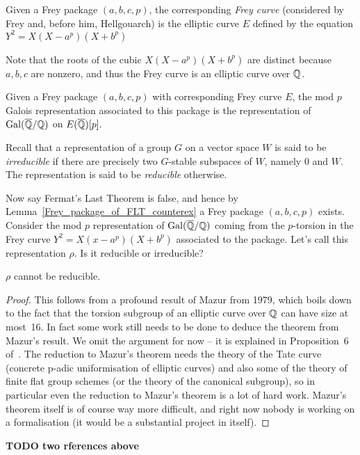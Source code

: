 \begin{definition}[Frey]\label{Frey_curve} Given a Frey package $(a,b,c,p)$, the corresponding \emph{Frey curve} (considered by Frey and, before him, Hellgouarch) is the elliptic curve $E$ defined by the equation $Y^2=X(X-a^p)(X+b^p)$\end{definition}

Note that the roots of the cubic $X(X-a^p)(X+b^p)$ are distinct because $a,b,c$ are nonzero, and thus the Frey curve is an
elliptic curve over $\mathbb{Q}$.

\begin{definition}\label{Frey_mod_p_Galois_representation} Given a Frey package $(a,b,c,p)$ with corresponding Frey curve $E$, the mod $p$ Galois representation associated to this package is the representation of $\operatorname{Gal}(\overline{\mathbb{Q}}/\mathbb{Q})$ on $E(\overline{\mathbb{Q}})[p].$\end{definition}

Recall that a representation of a group $G$ on a vector space $W$ is said to be \emph{irreducible} if there are precisely two $G$-stable subspaces of $W$, namely $0$ and $W$. The representation is said to be \emph{reducible} otherwise.

Now say Fermat's Last Theorem is false, and hence by Lemma~\ref{Frey_package_of_FLT_counterex} a Frey package $(a,b,c,p)$ exists.  Consider the mod $p$ representation of $\operatorname{Gal}(\overline{\mathbb{Q}}/\mathbb{Q})$ coming from the $p$-torsion in the Frey curve $Y^2=X(x-a^p)(X+b^p)$
associated to the package. Let's call this representation $\rho$. Is it reducible or irreducible?

\begin{theorem}[Mazur]\label{Mazur_on_Frey_curve}\leanok $\rho$ cannot be reducible.\end{theorem}
\begin{proof}\tangled This follows from a profound result of Mazur \cite{mazur} from 1979, which boils down to the fact that the torsion subgroup of an elliptic curve over $\mathbb{Q}$ can have size at most~16. In fact some work still needs to be done to deduce the theorem from Mazur's result. We omit the argument for now -- it is explained in Proposition~6 of~\cite{serreconj}. The reduction to Mazur's theorem
needs the theory of the Tate curve (concrete p-adic uniformisation of elliptic curves) and also some of the theory of finite flat group schemes (or the theory of the canonical subgroup), so in particular even the reduction to Mazur's theorem is a lot of hard work.
Mazur's theorem itself is of course way more difficult, and right now nobody is working on a formalisation (it would be a substantial
project in itself).
\end{proof}
{\bf TODO two rferences above}

